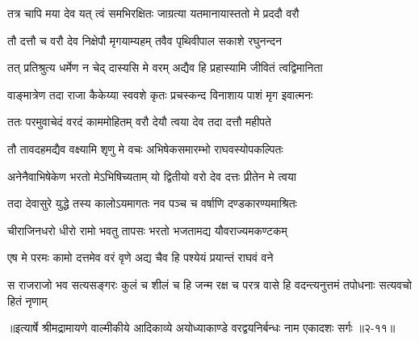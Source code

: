 \twolineshloka
{तत्र चापि मया देव यत् त्वं समभिरक्षितः}
{जाग्रत्या यतमानायास्ततो मे प्रददौ वरौ} %

\twolineshloka
{तौ दत्तौ च वरौ देव निक्षेपौ मृगयाम्यहम्}
{तवैव पृथिवीपाल सकाशे रघुनन्दन} %

\twolineshloka
{तत् प्रतिश्रुत्य धर्मेण न चेद् दास्यसि मे वरम्}
{अद्यैव हि प्रहास्यामि जीवितं त्वद्विमानिता} %

\twolineshloka
{वाङ्मात्रेण तदा राजा कैकेय्या स्ववशे कृतः}
{प्रचस्कन्द विनाशाय पाशं मृग इवात्मनः} %

\twolineshloka
{ततः परमुवाचेदं वरदं काममोहितम्}
{वरौ देयौ त्वया देव तदा दत्तौ महीपते} %

\twolineshloka
{तौ तावदहमद्यैव वक्ष्यामि शृणु मे वचः}
{अभिषेकसमारम्भो राघवस्योपकल्पितः} %

\twolineshloka
{अनेनैवाभिषेकेण भरतो मेऽभिषिच्यताम्}
{यो द्वितीयो वरो देव दत्तः प्रीतेन मे त्वया} %

\twolineshloka
{तदा देवासुरे युद्धे तस्य कालोऽयमागतः}
{नव पञ्च च वर्षाणि दण्डकारण्यमाश्रितः} %

\twolineshloka
{चीराजिनधरो धीरो रामो भवतु तापसः}
{भरतो भजतामद्य यौवराज्यमकण्टकम्} %

\twolineshloka
{एष मे परमः कामो दत्तमेव वरं वृणे}
{अद्य चैव हि पश्येयं प्रयान्तं राघवं वने} %

\twolineshloka
{स राजराजो भव सत्यसङ्गरः कुलं च शीलं च हि जन्म रक्ष च}
{परत्र वासे हि वदन्त्यनुत्तमं तपोधनाः सत्यवचो हितं नृणाम्} %


॥इत्यार्षे श्रीमद्रामायणे वाल्मीकीये आदिकाव्ये अयोध्याकाण्डे वरद्वयनिर्बन्धः नाम एकादशः सर्गः ॥२-११॥
